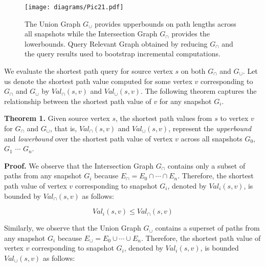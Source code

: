 \begin{figure}[!h]
    \centering
    \texttt{[image: diagrams/Pic21.pdf]}
    \vspace{-0.1in}
    \caption{The Union Graph $G_{\cup}$ provides upperbounds on path lengths across all snapshots while the Intersection Graph $G_{\cap}$ provides the lowerbounds. Query Relevant Graph obtained by reducing $G_{\cap}$ and the query results used to bootstrap incremental computations.}
    \label{alg2}
    \vspace{-0.15in}
\end{figure}



We evaluate the shortest path query for source vertex $s$ on both $G_\cap$ and $G_\cup$. Let us denote the shortest path value computed for some vertex $v$ corresponding to  $G_\cap$ and $G_\cup$ by $Val_\cap(s,v)$ and $Val_\cup(s,v)$. The following theorem captures the relationship between the shortest path value of $v$ for any snapshot $G_i$.



\vspace{0.1in}
\textbf{Theorem 1.} Given source vertex $s$, the shortest path values from $s$ to vertex $v$ for $G_\cap$ and $G_\cup$, that is,  $Val_\cap(s,v)$ and $Val_\cup(s,v)$, represent the \emph{upperbound} and \emph{lowerbound} over the shortest path value of vertex $v$ across all snapshots $G_0$, $G_1$ $\cdots$ $G_n$.

\textbf{Proof.} 
We observe that the Intersection Graph $G_\cap$ contains only a subset of paths from any snapshot $G_i$ because $E_\cap = E_0 \cap \cdots \cap E_n$. Therefore, the shortest path value of vertex $v$ corresponding to snapshot $G_i$, denoted by $Val_i(s,v)$, is bounded by $Val_\cap(s,v)$ as follows:

\vspace{-0.15in}
\[  Val_i(s,v) \leq Val_\cap(s,v) \]

Similarly, we observe that the Union Graph $G_\cup$ contains a superset of paths from any snapshot $G_i$ because $E_\cup = E_0 \cup \cdots \cup E_n$. Therefore, the shortest path value of vertex $v$ corresponding to snapshot $G_i$, denoted by $Val_i(s,v)$, is bounded $Val_\cup(s,v)$ as follows:


